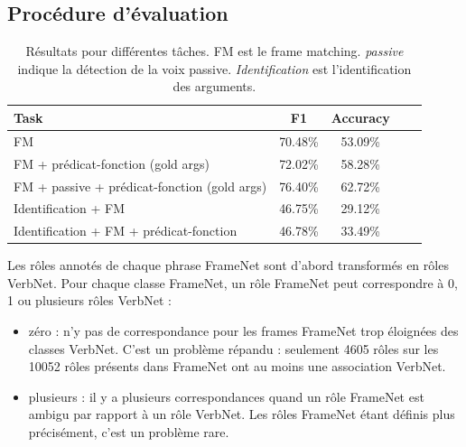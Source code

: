 
\subsection{Procédure d'évaluation}

\begin{table}[ht]
    \centering
    \begin{tabular}{lcccc}
        \toprule
        Task                                           & F1        & Accuracy \\
        \midrule
        FM                                             & 70.48\%   & 53.09\%  \\
        FM + prédicat-fonction (gold args)                & 72.02\%   & 58.28\%  \\
        FM + passive + prédicat-fonction (gold args)      & 76.40\%   & 62.72\%  \\
        \midrule
        Identification + FM                            & 46.75\%   & 29.12\%  \\
        Identification + FM + prédicat-fonction           & 46.78\%   & 33.49\%  \\
        \bottomrule
    \end{tabular}
    \caption{\protect\centering\label{table:results}Résultats pour différentes tâches. FM est le frame matching. \emph{passive} indique la détection de la voix passive. \emph{Identification} est l'identification des arguments.}
\end{table}

Les rôles annotés de chaque phrase FrameNet sont d'abord transformés en rôles
VerbNet. Pour chaque classe FrameNet, un rôle FrameNet peut correspondre à 0, 1
ou plusieurs rôles VerbNet :

\begin{itemize}

    \item zéro : n'y pas de correspondance pour les frames FrameNet trop éloignées
    des classes VerbNet. C'est un problème répandu :  seulement 4605 rôles sur les
    10052 rôles présents dans FrameNet ont au moins une association VerbNet.

    \item plusieurs : il y a plusieurs correspondances quand un rôle FrameNet
    est ambigu par rapport à un rôle VerbNet. Les rôles FrameNet étant définis plus
    précisément, c'est un problème rare. %

\end{itemize}

